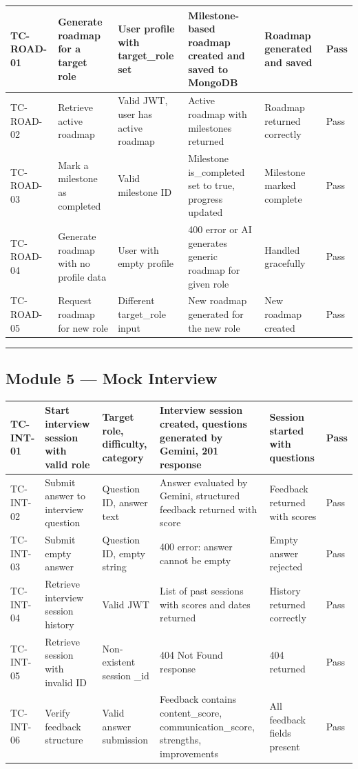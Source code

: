 \documentclass[12pt]{article}
\begin{document}
\begin{longtable}{|p{}|p{}|p{}|p{}|p{}|p{}|}
\hline
\textbf{TC-ROAD-01} & \textbf{Generate roadmap for a target role} & \textbf{User profile with target\_role set} & \textbf{Milestone-based roadmap created and saved to MongoDB} & \textbf{Roadmap generated and saved} & \textbf{Pass} \\ \hline
\endhead
TC-ROAD-02 & Retrieve active roadmap & Valid JWT, user has active roadmap & Active roadmap with milestones returned & Roadmap returned correctly & Pass \\ \hline
TC-ROAD-03 & Mark a milestone as completed & Valid milestone ID & Milestone is\_completed set to true, progress updated & Milestone marked complete & Pass \\ \hline
TC-ROAD-04 & Generate roadmap with no profile data & User with empty profile & 400 error or AI generates generic roadmap for given role & Handled gracefully & Pass \\ \hline
TC-ROAD-05 & Request roadmap for new role & Different target\_role input & New roadmap generated for the new role & New roadmap created & Pass \\ \hline
\end{longtable}



\noindent\rule{\textwidth}{0.4pt}

\subsection{Module 5 — Mock Interview}


\begin{longtable}{|p{}|p{}|p{}|p{}|p{}|p{}|}
\hline
\textbf{TC-INT-01} & \textbf{Start interview session with valid role} & \textbf{Target role, difficulty, category} & \textbf{Interview session created, questions generated by Gemini, 201 response} & \textbf{Session started with questions} & \textbf{Pass} \\ \hline
\endhead
TC-INT-02 & Submit answer to interview question & Question ID, answer text & Answer evaluated by Gemini, structured feedback returned with score & Feedback returned with scores & Pass \\ \hline
TC-INT-03 & Submit empty answer & Question ID, empty string & 400 error: answer cannot be empty & Empty answer rejected & Pass \\ \hline
TC-INT-04 & Retrieve interview session history & Valid JWT & List of past sessions with scores and dates returned & History returned correctly & Pass \\ \hline
TC-INT-05 & Retrieve session with invalid ID & Non-existent session \_id & 404 Not Found response & 404 returned & Pass \\ \hline
TC-INT-06 & Verify feedback structure & Valid answer submission & Feedback contains content\_score, communication\_score, strengths, improvements & All feedback fields present & Pass \\ \hline
\end{longtable}
\end{document}
